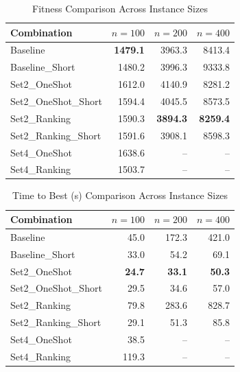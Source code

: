 \documentclass{article}
\begin{document}
\begin{table}[htbp]
\centering
\caption{Fitness Comparison Across Instance Sizes}
\label{tab:combined_fitness}
\begin{tabular}{lrrr}
\toprule
Combination & $n=100$ & $n=200$ & $n=400$ \\
\midrule
Baseline & \textbf{1479.1} & 3963.3 & 8413.4 \\
Baseline\_Short & 1480.2 & 3996.3 & 9333.8 \\
Set2\_OneShot & 1612.0 & 4140.9 & 8281.2 \\
Set2\_OneShot\_Short & 1594.4 & 4045.5 & 8573.5 \\
Set2\_Ranking & 1590.3 & \textbf{3894.3} & \textbf{8259.4} \\
Set2\_Ranking\_Short & 1591.6 & 3908.1 & 8598.3 \\
Set4\_OneShot & 1638.6 & -- & -- \\
Set4\_Ranking & 1503.7 & -- & -- \\
\bottomrule
\end{tabular}
\end{table}

\begin{table}[htbp]
\centering
\caption{Time to Best (s) Comparison Across Instance Sizes}
\label{tab:combined_time_to_best_s}
\begin{tabular}{lrrr}
\toprule
Combination & $n=100$ & $n=200$ & $n=400$ \\
\midrule
Baseline & 45.0 & 172.3 & 421.0 \\
Baseline\_Short & 33.0 & 54.2 & 69.1 \\
Set2\_OneShot & \textbf{24.7} & \textbf{33.1} & \textbf{50.3} \\
Set2\_OneShot\_Short & 29.5 & 34.6 & 57.0 \\
Set2\_Ranking & 79.8 & 283.6 & 828.7 \\
Set2\_Ranking\_Short & 29.1 & 51.3 & 85.8 \\
Set4\_OneShot & 38.5 & -- & -- \\
Set4\_Ranking & 119.3 & -- & -- \\
\bottomrule
\end{tabular}
\end{table}
\end{document}
